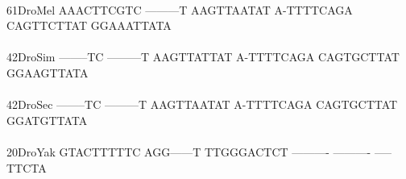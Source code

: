 \documentclass[11pt,twoside,reqno,a4paper]{article}
\begin{document}
{\\
61\hspace*{2\charwidth}DroMel	AAACTTCGTC	---------T	AAGTTAATAT	A-TTTTCAGA	CAGTTCTTAT	GGAAATTATA	\\
\hspace*{4\charwidth}\hspace*{7\charwidth}\hspace*{1\charwidth}\hspace*{1\charwidth}\hspace*{1\charwidth}\hspace*{1\charwidth}\hspace*{1\charwidth}\hspace*{1\charwidth}\\
42\hspace*{2\charwidth}DroSim	--------TC	---------T	AAGTTATTAT	A-TTTTCAGA	CAGTGCTTAT	GGAAGTTATA	\\
\hspace*{4\charwidth}\hspace*{7\charwidth}\hspace*{1\charwidth}\hspace*{1\charwidth}\hspace*{1\charwidth}\hspace*{1\charwidth}\hspace*{1\charwidth}\hspace*{1\charwidth}\\
42\hspace*{2\charwidth}DroSec	--------TC	---------T	AAGTTAATAT	A-TTTTCAGA	CAGTGCTTAT	GGATGTTATA	\\
\hspace*{4\charwidth}\hspace*{7\charwidth}\hspace*{1\charwidth}\hspace*{1\charwidth}\hspace*{1\charwidth}\hspace*{1\charwidth}\hspace*{1\charwidth}\hspace*{1\charwidth}\\
20\hspace*{2\charwidth}DroYak	GTACTTTTTC	AGG------T	TTGGGACTCT	----------	----------	-----TTCTA	\\
\hspace*{4\charwidth}\hspace*{7\charwidth}\hspace*{1\charwidth}\hspace*{1\charwidth}\hspace*{1\charwidth}\hspace*{1\charwidth}\hspace*{1\charwidth}\hspace*{1\charwidth}\\
}
\end{document}
